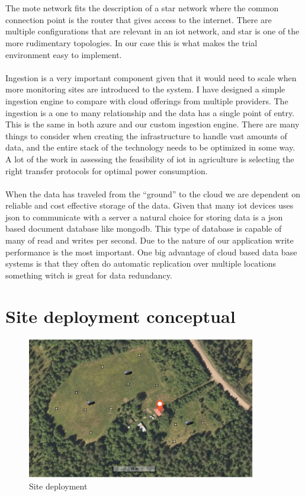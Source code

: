 \documentclass[]{uiophd}
\begin{document}
\\\\
The mote network fits the description of a star network where the common connection point is the router that gives access to the internet. There are multiple configurations that are relevant in an iot network, and star is one of the more rudimentary topologies. In our case this is what makes the trial environment easy to implement.
\\\\
Ingestion is a very important component given that it would need to scale when more monitoring sites are introduced to the system. I have designed a simple ingestion engine to compare with cloud offerings from multiple providers. The ingestion is a one to many relationship and the data has a single point of entry. This is the same in both azure and our custom ingestion engine. There are many things to consider when creating the infrastructure to handle vast amounts of data, and the entire stack of the technology needs to be optimized in some way. A lot of the work in assessing the feasibility of iot in agriculture is selecting the right transfer protocols for optimal power consumption.
\\\\
 When the data has traveled from the “ground” to the cloud we are dependent on reliable and cost effective storage of the data. Given that many iot devices uses json to communicate with a server a natural choice for storing data is a json based document database like mongodb. This type of database is capable of many of read and writes per second. Due to the nature of our application write performance is the most important. One big advantage of cloud based data base systems is that they often do automatic replication over multiple locations something witch is great for data redundancy.
 
 \section{Site deployment conceptual}
 \begin{figure}[h]
\caption{Site deployment}
\centering
\includegraphics[width=10cm]{hjemly.png}
\end{figure}
\end{document}
